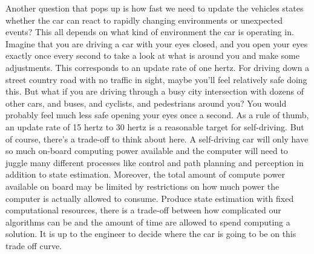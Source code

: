 Another question that pops up is how fast we need to update the vehicles states whether the car can react to rapidly changing environments or unexpected events? This all depends on what kind of environment the car is operating in. Imagine that you are driving a car with your eyes closed, and you open your eyes exactly once every second to take a look at what is around you and make some adjustments. This corresponds to an update rate of one hertz. For driving down a street country road with no traffic in sight, maybe you'll feel relatively safe doing this. But what if you are driving through a busy city intersection with dozens of other cars, and buses, and cyclists, and pedestrians around you? You would probably feel much less safe opening your eyes once a second. As a rule of thumb, an update rate of 15 hertz to 30 hertz is a reasonable target for self-driving. But of course, there's a trade-off to think about here. A self-driving car will only have so much on-board computing power available and the computer will need to juggle many different processes like control and path planning and perception in addition to state estimation. Moreover, the total amount of compute power available on board may be limited by restrictions on how much power the computer is actually allowed to consume. Produce state estimation with fixed computational resources, there is a trade-off between how complicated our algorithms can be and the amount of time are allowed to spend computing a solution. It is up to the engineer to decide where the car is going to be on this trade off curve. 

